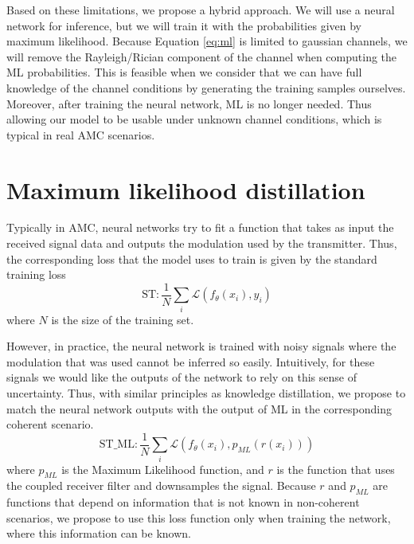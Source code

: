 \documentclass[conference]{IEEEtran}
\newcommand{\Ls}{\mathcal{L}}
\begin{document}
Based on these limitations, we propose a hybrid approach. We will use a neural network for inference, but we will train it with the probabilities given by maximum likelihood. Because Equation \ref{eq:ml} is limited to gaussian channels, we will remove the Rayleigh/Rician component of the channel when computing the ML probabilities. This is feasible when we consider that we can have full knowledge of the channel conditions by generating the training samples ourselves. Moreover, after training the neural network, ML is no longer needed. Thus allowing our model to be usable under unknown channel conditions, which is typical in real AMC scenarios.


\section{Maximum likelihood distillation}

Typically in AMC, neural networks try to fit a function that takes as input the received signal data and outputs the modulation used by the transmitter. Thus, the corresponding loss that the model uses to train is given by the standard training loss
\begin{equation}
    \text{ST} : \dfrac{1}{N}\sum_{i}\Ls(f_{\theta}(x_i), y_i)
\end{equation}
where $N$ is the size of the training set.

However, in practice, the neural network is trained with noisy signals where the modulation that was used cannot be inferred so easily. Intuitively, for these signals we would like the outputs of the network to rely on this sense of uncertainty. Thus, with similar principles as knowledge distillation, we propose to match the neural network outputs with the output of ML in the corresponding coherent scenario.
\begin{equation}
    \text{ST\_ML} : \dfrac{1}{N}\sum_{i}\Ls(f_{\theta}(x_i), p_{ML}(r(x_i)))
\label{eq:st_ml}
\end{equation}
where $p_{ML}$ is the Maximum Likelihood function, and $r$ is the function that uses the coupled receiver filter and downsamples the signal. Because $r$ and $p_{ML}$ are functions that depend on information that is not known in non-coherent scenarios, we propose to use this loss function only when training the network, where this information can be known.
\end{document}
